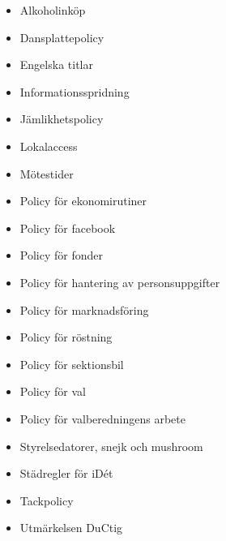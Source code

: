 \documentclass[]{dsekkallelse}
\begin{document}
\begin{itemize}
    \item Alkoholinköp
    \item Dansplattepolicy
    \item Engelska titlar
    \item Informationsspridning
    \item Jämlikhetspolicy
    \item Lokalaccess
    \item Mötestider
    \item Policy för ekonomirutiner
    \item Policy för facebook
    \item Policy för fonder
    \item Policy för hantering av personsuppgifter
    \item Policy för marknadsföring
    \item Policy för röstning
    \item Policy för sektionsbil
    \item Policy för val
    \item Policy för valberedningens arbete
    \item Styrelsedatorer, snejk och mushroom
    \item Städregler för iDét
    \item Tackpolicy
    \item Utmärkelsen DuCtig
\end{itemize}
\end{document}
